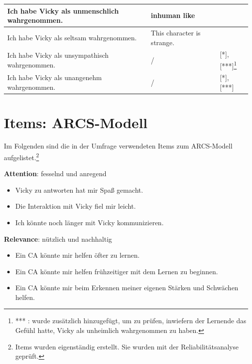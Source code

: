 \begin{longtable}{|m{6cm}|m{4cm}|m{5cm}|}
   Ich habe Vicky als unmenschlich wahrgenommen.& inhuman like   & \parencite[6 f.]{Holtgraves.2007}   \\ \hline
   Ich habe Vicky als seltsam wahrgenommen.& This character is strange.   & \parencite[13 ff.]{Tinwell.2014}    \\ \hline
   Ich habe Vicky als unsympathisch wahrgenommen.& /  & [*], [***]\footnote{*** : wurde zusätzlich hinzugefügt, um zu prüfen, inwiefern der Lernende das Gefühl hatte, Vicky als unheimlich wahrgenommen zu haben.}   \\ \hline
   Ich habe Vicky als unangenehm wahrgenommen.& /  & [*], [***]    \\ \hline

\end{longtable}
\label{tab:/Items_Wahrnehmung_Appendix} 
\endgroup

\section{Items: ARCS-Modell}\label{ARCSITEMS}
Im Folgenden sind die in der Umfrage verwendeten Items zum ARCS-Modell aufgelistet.\footnote{Items wurden eigenständig erstellt. Sie wurden mit der Reliabilitätsanalyse geprüft. } 

\begin{minipage}[t]{0.45\textwidth}
  \textbf{Attention}: fesselnd und anregend
  \begin{itemize}
      \item \glqq Vicky zu antworten hat mir Spaß gemacht.\grqq{} 
      \item \glqq Die Interaktion mit Vicky fiel mir leicht.\grqq{} 
      \item \glqq Ich könnte noch länger mit Vicky kommunizieren.\grqq{} 
  \end{itemize} 
  \end{minipage}
  \hfill
  \begin{minipage}[t]{0.45\textwidth}
  \textbf{Relevance}: nützlich und nachhaltig
  \begin{itemize}
  \item \glqq Ein CA könnte mir helfen öfter zu lernen.\grqq{}
  \item \glqq Ein CA könnte mir helfen frühzeitiger mit dem Lernen zu beginnen.\grqq{}
  \item \glqq Ein CA könnte mir beim Erkennen meiner eigenen Stärken und Schwächen helfen.\grqq{}\\
  \end{itemize}
  \end{minipage}
  
